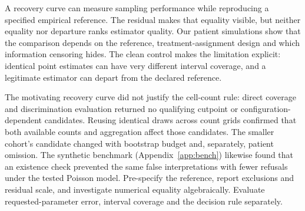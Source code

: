 A recovery curve can measure sampling performance while reproducing a specified
empirical reference. The residual makes that equality visible, but neither
equality nor departure ranks estimator quality. Our patient simulations show
that the comparison depends on the reference, treatment-assignment design and
which information censoring hides. The clean control makes the limitation
explicit: identical point estimates can have very different interval coverage,
and a legitimate estimator can depart from the declared reference.

The motivating recovery curve did not justify the cell-count rule: direct
coverage and discrimination evaluation returned no qualifying cutpoint or
configuration-dependent candidates. Reusing identical draws across count grids
confirmed that both available counts and aggregation affect those candidates.
The smaller cohort's candidate changed with bootstrap budget and, separately,
patient omission. The synthetic benchmark
(Appendix~\ref{app:bench}) likewise found that an existence check prevented the
same false interpretations with fewer refusals under the tested Poisson model.
Pre-specify the reference, report exclusions and residual scale, and investigate
numerical equality algebraically. Evaluate requested-parameter error, interval
coverage and the decision rule separately.

